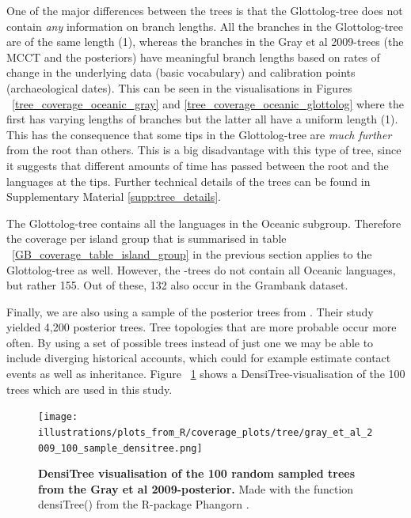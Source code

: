 \documentclass[12pt,letterpaper]{article}
\begin{document}
One of the major differences between the trees is that the Glottolog-tree does not contain \emph{any} information on branch lengths. All the branches in the Glottolog-tree are of the same length (1), whereas the branches in the Gray et al 2009-trees (the MCCT and the posteriors) have meaningful branch lengths based on rates of change in the underlying data (basic vocabulary) and calibration points (archaeological dates). This can be seen in the visualisations in Figures ~\ref{tree_coverage_oceanic_gray} and \ref{tree_coverage_oceanic_glottolog} where the first has varying lengths of branches but the latter all have a uniform length (1). This has the consequence that some tips in the Glottolog-tree are \emph{much further} from the root than others. This is a big disadvantage with this type of tree, since it suggests that different amounts of time has passed between the root and the languages at the tips. Further technical details of the trees can be found in Supplementary Material \ref{supp:tree_details}.

The Glottolog-tree contains all the languages in the Oceanic subgroup. Therefore the coverage per island group that is summarised in table ~\ref{GB_coverage_table_island_group} in the previous section applies to the Glottolog-tree as well. However, the \cite{grayetal_2009}-trees do not contain all Oceanic languages, but rather 155. Out of these, 132 also occur in the Grambank dataset. %

Finally, we are also using a sample of the posterior trees from \cite{grayetal_2009}. Their study yielded 4,200 posterior trees. Tree topologies that are more probable occur more often. By using a set of possible trees instead of just one we may be able to include diverging historical accounts, which could for example estimate contact events as well as inheritance. Figure ~\ref{densitree_plot} shows a DensiTree-visualisation \citep{bouckaert2014densitree} of the 100 trees which are used in this study.

\begin{figure}[ht]
\centering
\texttt{[image: illustrations/plots\_from\_R/coverage\_plots/tree/gray\_et\_al\_2009\_100\_sample\_densitree.png]}
\caption{\textbf{DensiTree \citep{bouckaert2014densitree} visualisation of the 100 random sampled trees from the Gray et al 2009-posterior.} Made with the function densiTree() from the R-package Phangorn \citep{phangorn}.}
\label{densitree_plot}
\end{figure}
\end{document}
